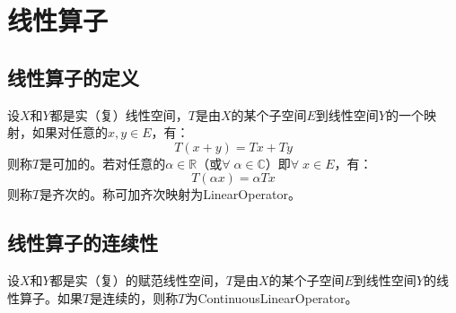 \section{线性算子}

\subsection{线性算子的定义}
\begin{definition}
	设$X$和$Y$都是实（复）线性空间，$T$是由$X$的某个子空间$E$到线性空间$Y$的一个映射，如果对任意的$x,y\in E$，有：
	\begin{equation*}
		T(x+y)=Tx+Ty
	\end{equation*}
	则称$T$是可加的。若对任意的$\alpha\in\mathbb{R}$（或$\forall\;\alpha\in\mathbb{C}$）即$\forall\;x\in E$，有：
	\begin{equation*}
		T(\alpha x)=\alpha Tx
	\end{equation*}
	则称$T$是齐次的。称可加齐次映射为\gls{LinearOperator}。
\end{definition}

\subsection{线性算子的连续性}
\begin{definition}
	设$X$和$Y$都是实（复）的赋范线性空间，$T$是由$X$的某个子空间$E$到线性空间$Y$的线性算子。如果$T$是连续的，则称$T$为\gls{ContinuousLinearOperator}。
\end{definition}
